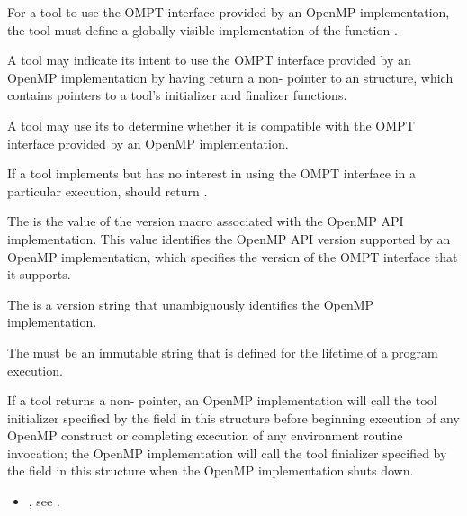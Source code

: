 \descr
For a tool to use the OMPT interface provided by an OpenMP implementation,
the tool must define a globally-visible implementation of the
function .

A tool may indicate its intent to use the OMPT interface provided
by an OpenMP implementation by having
 return a non- pointer to an
 structure, which contains pointers to
a tool's initializer and finalizer functions.

A tool may use its \callbackarg{}  to determine
whether it is compatible with the OMPT interface provided by an OpenMP
implementation.

If a tool implements  but has no interest in using
the OMPT interface in a particular execution,
 should return . 

\argdesc

The \callbackarg{}  
is the value of the  version macro 
associated with the OpenMP API implementation. This value 
identifies the OpenMP API version supported by an OpenMP implementation,
which specifies the version of the OMPT interface that it supports.

The \callbackarg{} 
is a version string that unambiguously identifies the OpenMP implementation.

\constraints

The \callbackarg{}  must be
an immutable string that is defined for the lifetime of a program
execution.

\effect
If a tool returns a non- pointer,
an OpenMP implementation will call the tool initializer specified by the
 field in this structure before
beginning execution of any OpenMP construct
or completing execution of any environment routine invocation; the
OpenMP implementation will call the tool finializer specified by the
 field in this structure when the OpenMP
implementation shuts down.



\crossreferences
\begin{itemize}
    \item {}, see .
\end{itemize}

